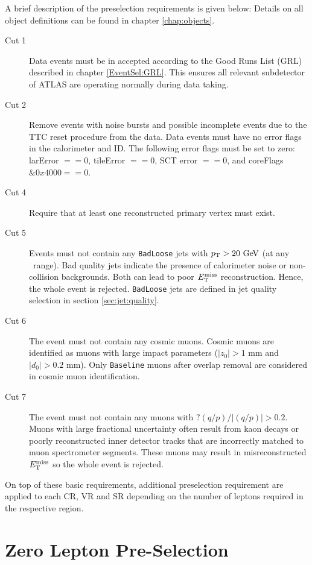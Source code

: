 \indent A brief description of the preselection requirements is given below: Details on all object definitions can be found in chapter \ref{chap:objects}. \\

\begin{description}
\item[Cut 1] Data events must be in accepted according to the Good Runs List (GRL) described in chapter \ref{EventSel:GRL}.  This ensures all relevant subdetector of ATLAS are operating normally during data taking. 
\item[Cut 2] Remove events with noise bursts and possible incomplete events due to the TTC reset procedure from the data. Data events must have no error flags in the calorimeter and ID.  The following error flags must be set to zero: larError $== 0$, tileError $== 0$, SCT error $==0$, and coreFlags $\&0x4000 == 0$.
\item[Cut 4] Require that at least one reconstructed primary vertex must exist.
\item[Cut 5] Events must not contain any {\tt BadLoose} jets with $\pT > 20 \gev$ (at any \eta\ range). Bad quality jets indicate the presence of calorimeter noise or non-collision backgrounds. Both can lead to poor $E_{\mathrm{T}}^{\mathrm{miss}}$ reconstruction. Hence, the whole event is rejected.  {\tt BadLoose} jets are defined in jet quality selection in section \ref{sec:jet:quality}.  
\item[Cut 6] The event must not contain any cosmic muons.  Cosmic muons are identified as muons with large impact parameters  ($|z_0| > 1$ mm and $|d_0| > 0.2$ mm).  Only {\tt Baseline} muons after overlap removal are considered in cosmic muon identification.
\item[Cut 7] The event must not contain any muons with $?(q/p)/|(q/p)| > 0.2$.  Muons with large fractional uncertainty often result from kaon decays or poorly reconstructed inner detector tracks that are incorrectly matched to muon spectrometer segments. These muons may result in misreconstructed $E_{\mathrm{T}}^{\mathrm{miss}}$ so the whole event is rejected.
\end{description}

\indent On top of these basic requirements, additional preselection requirement are applied to each CR, VR and SR depending on the number of leptons required in the respective region.  \\

\section{Zero Lepton Pre-Selection}

